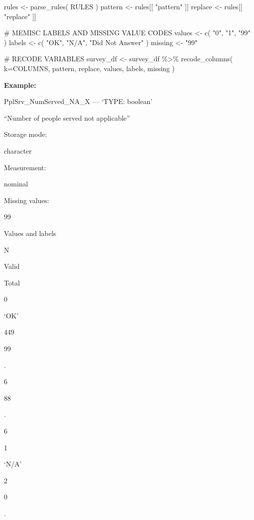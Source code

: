 \documentclass[
  letterpaper,
]{scrbook}
\newenvironment{Shaded}{\begin{snugshade}}{\end{snugshade}}
\newcommand{\AttributeTok}[1]{\textcolor[rgb]{0.40,0.45,0.13}{#1}}
\newcommand{\CommentTok}[1]{\textcolor[rgb]{0.37,0.37,0.37}{#1}}
\newcommand{\FunctionTok}[1]{\textcolor[rgb]{0.28,0.35,0.67}{#1}}
\newcommand{\NormalTok}[1]{\textcolor[rgb]{0.00,0.23,0.31}{#1}}
\newcommand{\OtherTok}[1]{\textcolor[rgb]{0.00,0.23,0.31}{#1}}
\newcommand{\SpecialCharTok}[1]{\textcolor[rgb]{0.37,0.37,0.37}{#1}}
\newcommand{\StringTok}[1]{\textcolor[rgb]{0.13,0.47,0.30}{#1}}
\begin{document}
\begin{Shaded}
\begin{Highlighting}[]
\NormalTok{rules }\OtherTok{\textless{}{-}} \FunctionTok{parse\_rules}\NormalTok{( RULES )          }
\NormalTok{pattern }\OtherTok{\textless{}{-}}\NormalTok{ rules[[ }\StringTok{"pattern"}\NormalTok{ ]]}
\NormalTok{replace }\OtherTok{\textless{}{-}}\NormalTok{ rules[[ }\StringTok{"replace"}\NormalTok{ ]]}


\CommentTok{\# MEMISC LABELS AND MISSING VALUE CODES }
\NormalTok{values  }\OtherTok{\textless{}{-}} \FunctionTok{c}\NormalTok{( }\StringTok{"0"}\NormalTok{, }\StringTok{"1"}\NormalTok{, }\StringTok{"99"}\NormalTok{ )}
\NormalTok{labels  }\OtherTok{\textless{}{-}} \FunctionTok{c}\NormalTok{( }\StringTok{"OK"}\NormalTok{, }\StringTok{"N/A"}\NormalTok{, }\StringTok{"Did Not Answer"}\NormalTok{ )}
\NormalTok{missing }\OtherTok{\textless{}{-}} \StringTok{"99"}

\CommentTok{\# RECODE VARIABLES }
\NormalTok{survey\_df }\OtherTok{\textless{}{-}} 
\NormalTok{  survey\_df }\SpecialCharTok{\%\textgreater{}\%} 
  \FunctionTok{recode\_columns}\NormalTok{( }\AttributeTok{k=}\NormalTok{COLUMNS, pattern, replace, values, labels, missing )}
\end{Highlighting}
\end{Shaded}

\textbf{Example:}

PplSrv\_NumServed\_NA\_X --- {`TYPE: boolean'}

``Number of people served not applicable''

Storage mode:

character

Measurement:

nominal

Missing values:

99

Values and labels

N

Valid

Total

0

`OK'

449

99

.

6

88

.

6

1

`N/A'

2

0

.
\end{document}
